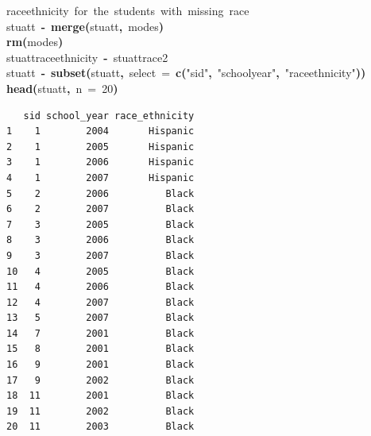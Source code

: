 \documentclass[12pt]{article}
\makeatletter
\newcommand{\hlnumber}[1]{\textcolor[rgb]{0,0,0}{#1}}%
\newcommand{\hlfunctioncall}[1]{\textcolor[rgb]{0.501960784313725,0,0.329411764705882}{\textbf{#1}}}%
\newcommand{\hlstring}[1]{\textcolor[rgb]{0.6,0.6,1}{#1}}%
\newcommand{\hlkeyword}[1]{\textcolor[rgb]{0,0,0}{\textbf{#1}}}%
\newcommand{\hlargument}[1]{\textcolor[rgb]{0.690196078431373,0.250980392156863,0.0196078431372549}{#1}}%
\newcommand{\hlcomment}[1]{\textcolor[rgb]{0.180392156862745,0.6,0.341176470588235}{#1}}%
\newcommand{\hlassignement}[1]{\textcolor[rgb]{0,0,0}{\textbf{#1}}}%
\newcommand{\hlsymbol}[1]{\textcolor[rgb]{0,0,0}{#1}}%
\newcommand{\hlstd}[1]{\textcolor[rgb]{0,0,0}{#1}}%
\newenvironment{kframe}{%
 \def\FrameCommand##1{\hskip\@totalleftmargin \hskip-\fboxsep
 \colorbox{shadecolor}{##1}\hskip-\fboxsep
     \hskip-\linewidth \hskip-\@totalleftmargin \hskip\columnwidth}%
 \MakeFramed {\advance\hsize-\width
   \@totalleftmargin\z@ \linewidth\hsize
   \@setminipage}}%
 {\par\unskip\endMakeFramed}
\newenvironment{knitrout}{}{} %
\renewenvironment{knitrout}{\begin{footnotesize}}{\end{footnotesize}}
\makeatother
\begin{document}
\begin{knitrout}
\begin{kframe}
\begin{flushleft}
\hlstd{}\hlcomment{\usebox{\hlnormalsizeboxhash}{\ }race\usebox{\hlnormalsizeboxunderscore}ethnicity{\ }for{\ }the{\ }students{\ }with{\ }missing{\ }race}\hspace*{\fill}\\
\hlstd{}\hlsymbol{stuatt}{\ }\hlassignement{\usebox{\hlnormalsizeboxlessthan}-}{\ }\hlfunctioncall{merge}\hlkeyword{(}\hlsymbol{stuatt}\hlkeyword{,}{\ }\hlsymbol{modes}\hlkeyword{)}\hspace*{\fill}\\
\hlstd{}\hlfunctioncall{rm}\hlkeyword{(}\hlsymbol{modes}\hlkeyword{)}\hspace*{\fill}\\
\hlstd{}\hlsymbol{stuatt}\hlkeyword{\usebox{\hlnormalsizeboxdollar}}\hlsymbol{race\usebox{\hlnormalsizeboxunderscore}ethnicity}{\ }\hlassignement{\usebox{\hlnormalsizeboxlessthan}-}{\ }\hlsymbol{stuatt}\hlkeyword{\usebox{\hlnormalsizeboxdollar}}\hlsymbol{race2}\hspace*{\fill}\\
\hlstd{}\hlsymbol{stuatt}{\ }\hlassignement{\usebox{\hlnormalsizeboxlessthan}-}{\ }\hlfunctioncall{subset}\hlkeyword{(}\hlsymbol{stuatt}\hlkeyword{,}{\ }\hlargument{select}{\ }\hlargument{=}{\ }\hlfunctioncall{c}\hlkeyword{(}\hlstring{"{}sid"{}}\hlkeyword{,}{\ }\hlstring{"{}school\usebox{\hlnormalsizeboxunderscore}year"{}}\hlkeyword{,}{\ }\hlstring{"{}race\usebox{\hlnormalsizeboxunderscore}ethnicity"{}}\hlkeyword{)}\hlkeyword{)}\hspace*{\fill}\\
\hlstd{}\hlfunctioncall{head}\hlkeyword{(}\hlsymbol{stuatt}\hlkeyword{,}{\ }\hlargument{n}{\ }\hlargument{=}{\ }\hlnumber{20}\hlkeyword{)}\mbox{}
\normalfont
\end{flushleft}
\begin{verbatim}
   sid school_year race_ethnicity
1    1        2004       Hispanic
2    1        2005       Hispanic
3    1        2006       Hispanic
4    1        2007       Hispanic
5    2        2006          Black
6    2        2007          Black
7    3        2005          Black
8    3        2006          Black
9    3        2007          Black
10   4        2005          Black
11   4        2006          Black
12   4        2007          Black
13   5        2007          Black
14   7        2001          Black
15   8        2001          Black
16   9        2001          Black
17   9        2002          Black
18  11        2001          Black
19  11        2002          Black
20  11        2003          Black
\end{verbatim}
\end{kframe}
\end{knitrout}
\end{document}
